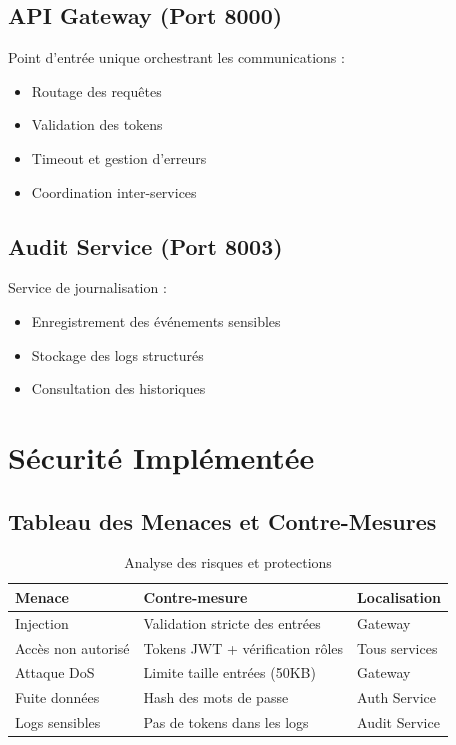 \documentclass[12pt,a4paper]{article}
\begin{document}
\subsection{API Gateway (Port 8000)}
Point d'entrée unique orchestrant les communications :
\begin{itemize}
    \item Routage des requêtes
    \item Validation des tokens
    \item Timeout et gestion d'erreurs
    \item Coordination inter-services
\end{itemize}

\subsection{Audit Service (Port 8003)}
Service de journalisation :
\begin{itemize}
    \item Enregistrement des événements sensibles
    \item Stockage des logs structurés
    \item Consultation des historiques
\end{itemize}

\section{Sécurité Implémentée}

\subsection{Tableau des Menaces et Contre-Mesures}

\begin{table}[H]
\centering
\begin{tabular}{|p{3cm}|p{5cm}|p{4cm}|}
\hline
\textbf{Menace} & \textbf{Contre-mesure} & \textbf{Localisation} \\
\hline
Injection & Validation stricte des entrées & Gateway \\
\hline
Accès non autorisé & Tokens JWT + vérification rôles & Tous services \\
\hline
Attaque DoS & Limite taille entrées (50KB) & Gateway \\
\hline
Fuite données & Hash des mots de passe & Auth Service \\
\hline
Logs sensibles & Pas de tokens dans les logs & Audit Service \\
\hline
\end{tabular}
\caption{Analyse des risques et protections}
\end{table}
\end{document}

